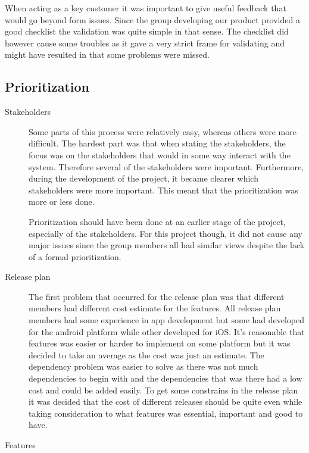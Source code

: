 \documentclass[10pt,a4paper]{article}
\begin{document}
When acting as a key customer it was important to give useful feedback that would go beyond form issues. Since the group developing our product provided a good checklist the validation was quite simple in that sense. The checklist did however cause some troubles as it gave a very strict frame for validating and might have resulted in that some problems were missed.


\subsection{Prioritization}
\begin{description}
\item[Stakeholders] Some parts of this process were relatively easy, whereas others were more difficult. The hardest part was that when stating the stakeholders, the focus was on the stakeholders that would in some way interact with the system. Therefore several of the stakeholders were important. Furthermore, during the development of the project, it became clearer which stakeholders were more important. This meant that the prioritization was more or less done. 

Prioritization should have been done at an earlier stage of the project, especially of the stakeholders. For this project though, it did not cause any major issues since the group members all had similar views despite the lack of a formal prioritization. 

\item[Release plan]
The first problem that occurred for the release plan was that different members had different cost estimate for the features. All release plan members had some experience in app development but some had developed for the android platform while other developed for iOS. It’s reasonable that features was easier or harder to implement on some platform but it was decided to take an average as the cost was just an estimate. The dependency problem was easier to solve as there was not much dependencies to begin with and the dependencies that was there had a low cost and could be added easily. To get some constrains in the release plan it was decided that the cost of different releases should be quite even while taking consideration to what features was essential, important and good to have.

\item[Features]
\end{description}
\end{document}
